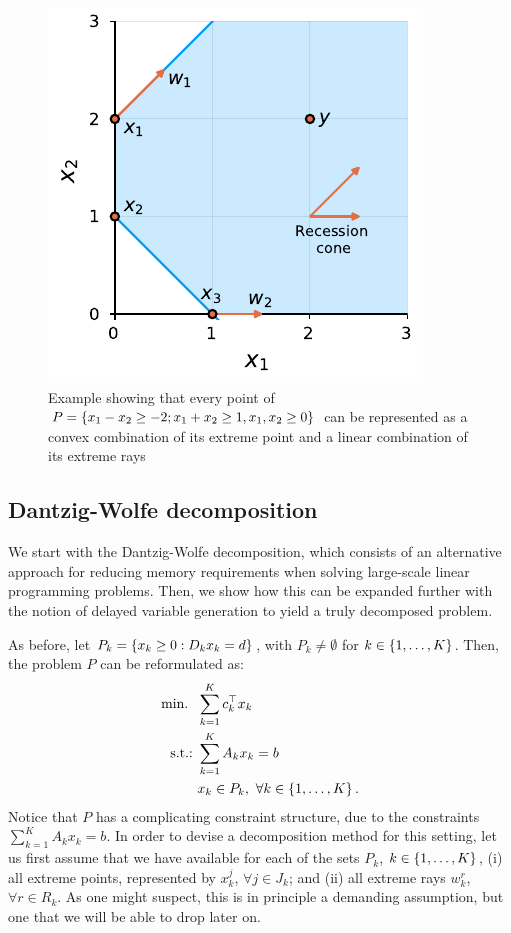 \begin{figure}[h]
	\includegraphics{part_1/chapter_7/figures/Figure1.pdf}
	\caption{Example showing that every point of $P = \left\{ x_1 - x_2 \geq -2; x_1 + x_2 \geq 1, x_1,x_2 \geq 0 \right \}$ can be represented as a convex combination of its extreme point and a linear combination of its extreme rays} \label{p1c7:fig:resolution_example}
\end{figure}


\subsection{Dantzig-Wolfe decomposition}

We start with the Dantzig-Wolfe decomposition, which consists of an alternative approach for reducing memory requirements when solving large-scale linear programming problems. Then, we show how this can be expanded further with the notion of delayed variable generation to yield a truly decomposed problem.

As before, let $P_k = \left\{ x_k \geq 0 : D_kx_k = d \right \}$, with $P_k \neq \emptyset$ for $k \in \left\{ 1,\dots,K \right \}$. Then, the problem $P$ can be reformulated as:
%
\begin{align*}
	\mathop{\text{min.~}} \ & \sum_{k = 1}^K c_k ^\top x_k 	\\
	\mathop{\text{s.t.:~}} & \sum_{k=1}^K A_k x_k = b \\
	& x_k \in P_k, \ \forall k \in \left\{ 1,\dots,K \right \}. 
\end{align*}
%
Notice that $P$ has a complicating constraint structure, due to the constraints $\sum_{k=1}^K A_k x_k = b$. In order to devise a decomposition method for this setting, let us first assume that we have available for each of the sets $P_k$, $k \in \left\{ 1,\dots,K \right \}$, (i) all extreme points, represented by $x_k^j$, $\forall j \in J_k$; and (ii) all extreme rays $w_k^r$, $\forall r \in R_k$. As one might suspect, this is in principle a demanding assumption, but one that we will be able to drop later on.

